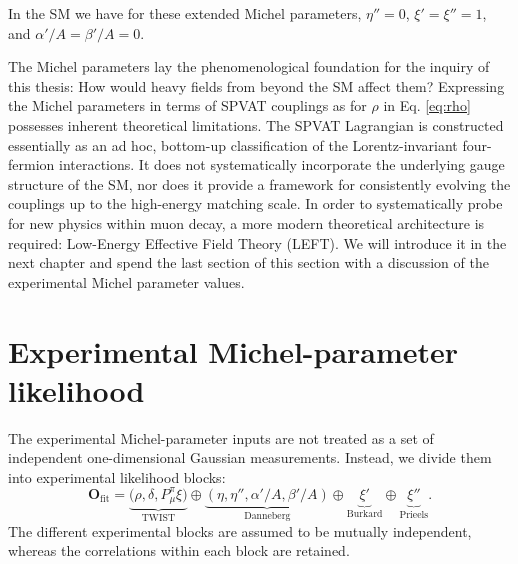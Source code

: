 In the SM we have for these extended Michel parameters, $\eta''=0$, $\xi'=\xi''=1$, and $\alpha'/A=\beta'/A=0$. 

The Michel parameters lay the phenomenological foundation for the inquiry of this thesis: How would heavy fields from beyond the SM affect them? Expressing the Michel parameters in terms of SPVAT couplings as for $\rho$ in Eq. \ref{eq:rho} possesses inherent theoretical limitations. The SPVAT Lagrangian is constructed essentially as an ad hoc, bottom-up classification of the Lorentz-invariant four-fermion interactions. It does not systematically incorporate the underlying gauge structure of the SM, nor does it provide a framework for consistently evolving the couplings up to the high-energy matching scale. In order to systematically probe for new physics within muon decay, a more modern theoretical architecture is required: Low-Energy Effective Field Theory (LEFT). We will introduce it in the next chapter and spend the last section of this section with a discussion of the experimental Michel parameter values. 

\section{Experimental Michel-parameter likelihood}
\label{sec:michel-likelihood}

The experimental Michel-parameter inputs are not treated as a set of
independent one-dimensional Gaussian measurements. Instead, we divide
them into experimental likelihood blocks:
\begin{equation}
  \bm{O}_{\mathrm{fit}}
  =
  \underbrace{
    \bigl(\rho,\delta,P_\mu^\pi\xi\bigr)
  }_{\mathrm{TWIST}}
  \oplus
  \underbrace{
    \left(\eta,\eta'',\alpha'/A,\beta'/A\right)
  }_{\mathrm{Danneberg}}
  \oplus
  \underbrace{\xi'}_{\mathrm{Burkard}}
  \oplus
  \underbrace{\xi''}_{\mathrm{Prieels}}.
  \label{eq:michel-fit-vector}
\end{equation}
The different experimental blocks are assumed to be mutually
independent, whereas the correlations within each block are retained.

